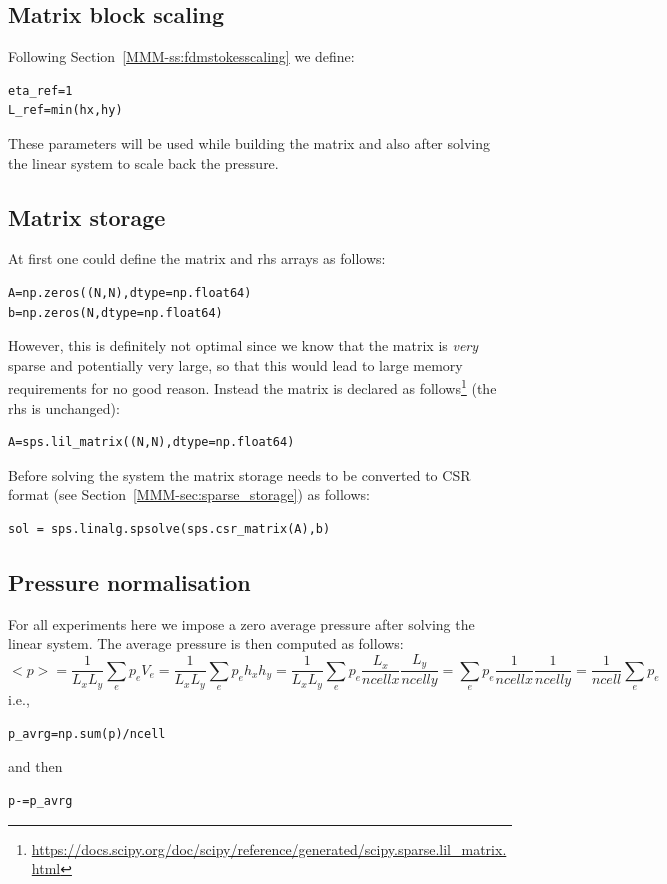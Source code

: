 \subsection*{Matrix block scaling}

Following Section~\ref{MMM-ss:fdmstokesscaling} we define:

\begin{lstlisting}
eta_ref=1
L_ref=min(hx,hy)
\end{lstlisting}

These parameters will be used while building the matrix and also 
after solving the linear system to scale back the pressure. 

\subsection*{Matrix storage}

At first one could define the matrix and rhs arrays as follows:
\begin{lstlisting}
A=np.zeros((N,N),dtype=np.float64)
b=np.zeros(N,dtype=np.float64)
\end{lstlisting}
However, this is definitely not optimal since we know that the 
matrix is {\it very} sparse and potentially very large, so that 
this would lead to large memory requirements for no good reason.
Instead the matrix is declared as follows\footnote{
\url{https://docs.scipy.org/doc/scipy/reference/generated/scipy.sparse.lil_matrix.html}} 
(the rhs is unchanged):
\begin{lstlisting}
A=sps.lil_matrix((N,N),dtype=np.float64)
\end{lstlisting}
Before solving the system the matrix storage needs to be 
converted to CSR format (see Section~\ref{MMM-sec:sparse_storage}) as follows:
\begin{lstlisting}
sol = sps.linalg.spsolve(sps.csr_matrix(A),b)
\end{lstlisting}

\subsection*{Pressure normalisation}

For all experiments here we impose a zero average pressure
after solving the linear system. 
The average pressure is then computed as follows:
\[
<p> 
= \frac{1}{L_xL_y} \sum_e p_e  V_e
= \frac{1}{L_xL_y} \sum_e p_e  h_x h_y
= \frac{1}{L_xL_y} \sum_e p_e  \frac{L_x}{ncellx } \frac{L_y}{ncelly}
= \sum_e p_e  \frac{1}{ncellx } \frac{1}{ncelly}
= \frac{1}{ncell} \sum_e p_e 
\]
i.e.,
\begin{lstlisting}
p_avrg=np.sum(p)/ncell
\end{lstlisting}
and then
\begin{lstlisting}
p-=p_avrg
\end{lstlisting}

